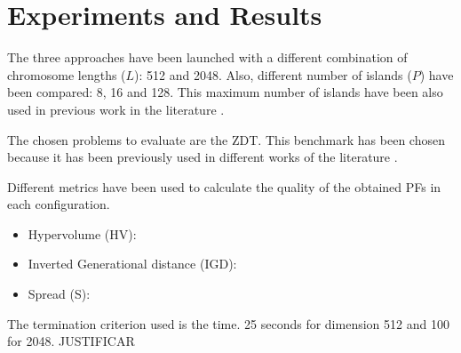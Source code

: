 \documentclass[runningheads,a4paper]{llncs}
\begin{document}


%
\section{Experiments and Results}
\label{sec:res}

The three approaches have been launched with a different combination of chromosome lengths ($L$): 512 and 2048. Also, different number of islands ($P$) have been compared: 8, 16 and 128. This maximum number of islands have been also used in previous work in the literature \cite{Martens13asynchronous}.

The chosen problems to evaluate are the ZDT. This benchmark has been chosen because it has been previously used in different works of the literature \cite{Deb03distributed,Martens13asynchronous,Wang09parallel,Durillo08masterslave}.

Different metrics have been used to calculate the quality of the obtained PFs in each configuration.

\begin{itemize}
\item Hypervolume (HV):
\item Inverted Generational distance (IGD):
\item Spread (S):
\end{itemize}

The termination criterion used is the time. 25 seconds for dimension 512 and 100 for 2048. JUSTIFICAR
\end{document}
